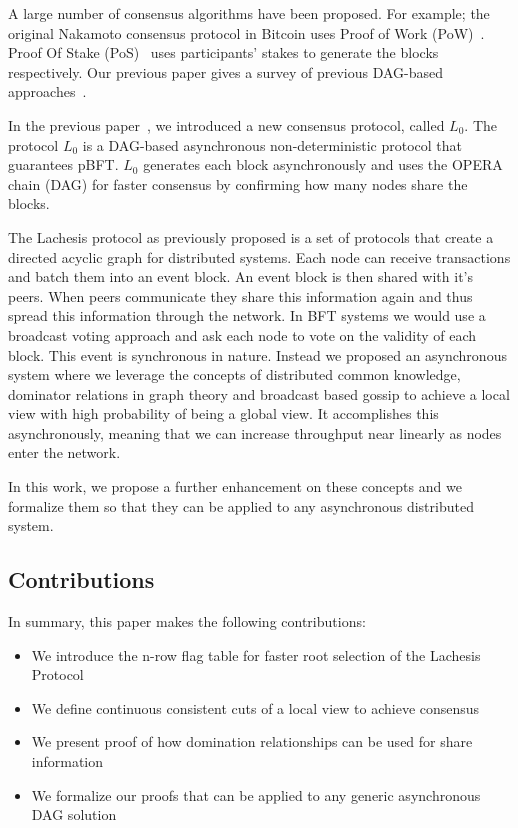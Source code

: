 \documentclass{article}
\begin{document}
A large number of consensus algorithms have been proposed. For example; 
the original Nakamoto consensus protocol in Bitcoin uses Proof of Work (PoW)~\cite{bitcoin08}. Proof Of Stake (PoS)~\cite{ppcoin12,dpos14} uses participants' stakes to generate the blocks respectively. Our previous paper gives a survey of previous DAG-based approaches~\cite{lachesis01}.

In the previous paper~\cite{lachesis01},  we introduced a new consensus protocol, called $L_0$. The protocol $L_0$ is a DAG-based asynchronous non-deterministic protocol that guarantees pBFT.
$L_0$ generates each block asynchronously and uses the OPERA chain (DAG) for faster consensus by confirming how many nodes share the blocks.

The Lachesis protocol as previously proposed is a set of protocols that create a directed acyclic graph for distributed systems. Each node can receive transactions and batch them into an event block. An event block is then shared with it's peers. When peers communicate they share this information again and thus spread this information through the network. In BFT systems we would use a broadcast voting approach and ask each node to vote on the validity of each block. This event is synchronous in nature. Instead we proposed an asynchronous system where we leverage the concepts of distributed common knowledge, dominator relations in graph theory and broadcast based gossip to achieve a local view with high probability of being a global view. It accomplishes this asynchronously, meaning that we can increase throughput near linearly as nodes enter the network.

In this work, we propose a further enhancement on these concepts and we formalize them so that they can be applied to any asynchronous distributed system.

\subsection{Contributions}

In summary, this paper makes the following contributions:

\begin{itemize}
\item We introduce the n-row flag table for faster root selection of the Lachesis Protocol
\item We define continuous consistent cuts of a local view to achieve consensus
\item We present proof of how domination relationships can be used for share information
\item We formalize our proofs that can be applied to any generic asynchronous DAG solution
\end{itemize}
\end{document}

